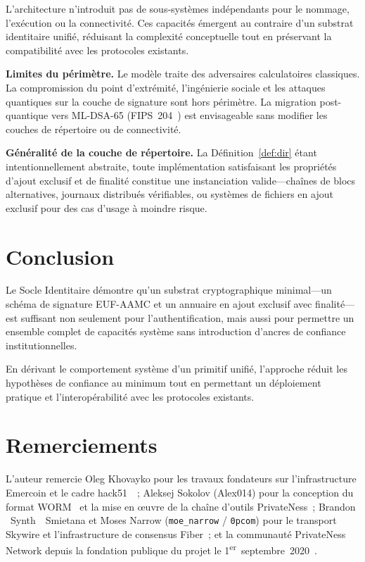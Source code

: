 \documentclass[11pt,a4paper]{article}
\begin{document}
L'architecture n'introduit pas de sous-systèmes indépendants pour le nommage,
l'exécution ou la connectivité.  Ces capacités émergent au contraire d'un
substrat identitaire unifié, réduisant la complexité conceptuelle tout en
préservant la compatibilité avec les protocoles existants.

\textbf{Limites du périmètre.}  Le modèle traite des adversaires
calculatoires classiques.  La compromission du point d'extrémité, l'ingénierie
sociale et les attaques quantiques sur la couche de signature sont hors
périmètre.  La migration post-quantique vers ML-DSA-65 (FIPS~204~\cite{fips204})
est envisageable sans modifier les couches de répertoire ou de connectivité.

\textbf{Généralité de la couche de répertoire.}  La Définition~\ref{def:dir}
étant intentionnellement abstraite, toute implémentation satisfaisant les
propriétés d'ajout exclusif et de finalité constitue une instanciation
valide---chaînes de blocs alternatives, journaux distribués vérifiables, ou
systèmes de fichiers en ajout exclusif pour des cas d'usage à moindre risque.

\section{Conclusion}

Le Socle Identitaire démontre qu'un substrat cryptographique minimal---un
schéma de signature EUF-AAMC et un annuaire en ajout exclusif avec
finalité---est suffisant non seulement pour l'authentification, mais aussi
pour permettre un ensemble complet de capacités système sans introduction
d'ancres de confiance institutionnelles.

En dérivant le comportement système d'un primitif unifié, l'approche réduit
les hypothèses de confiance au minimum tout en permettant un déploiement
pratique et l'interopérabilité avec les protocoles existants.

\section*{Remerciements}

L'auteur remercie Oleg Khovayko pour les travaux fondateurs sur
l'infrastructure Emercoin et le cadre hack51~\cite{hack51}~; Aleksej Sokolov
(Alex014) pour la conception du format WORM~\cite{worm} et la mise en œuvre
de la chaîne d'outils PrivateNess~; Brandon \og~Synth~\fg~Smietana et Moses
Narrow (\texttt{moe\_narrow} / \texttt{0pcom}) pour le transport Skywire et
l'infrastructure de consensus Fiber~; et la communauté PrivateNess Network
depuis la fondation publique du projet le
1\textsuperscript{er}~septembre~2020~\cite{bitcointalk}.
\end{document}
